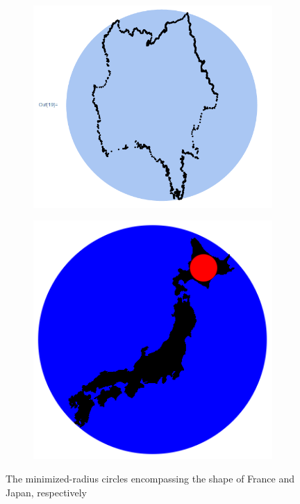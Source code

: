 \documentclass[11pt]{extarticle}
\begin{document}
    \begin{figure}[!ht]
        \begin{subfigure}{.5\textwidth}
            \centering
            \includegraphics[scale=.35]{france.png}
        \end{subfigure}
        \begin{subfigure}{.5\textwidth}
            \centering
            \includegraphics[scale=.5]{japan.png}
        \end{subfigure}
        \caption{The minimized-radius circles encompassing the shape of France and Japan, respectively}
    \end{figure}
\end{document}
